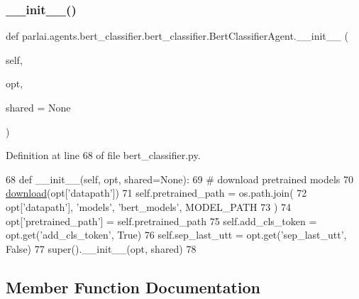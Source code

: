 \subsubsection{\texorpdfstring{\+\_\+\+\_\+init\+\_\+\+\_\+()}{\_\_init\_\_()}}
{\footnotesize\ttfamily def parlai.\+agents.\+bert\+\_\+classifier.\+bert\+\_\+classifier.\+Bert\+Classifier\+Agent.\+\_\+\+\_\+init\+\_\+\+\_\+ (\begin{DoxyParamCaption}\item[{}]{self,  }\item[{}]{opt,  }\item[{}]{shared = {\ttfamily None} }\end{DoxyParamCaption})}



Definition at line 68 of file bert\+\_\+classifier.\+py.


\begin{DoxyCode}
68     \textcolor{keyword}{def }\_\_init\_\_(self, opt, shared=None):
69         \textcolor{comment}{# download pretrained models}
70         \hyperlink{namespaceparlai_1_1core_1_1build__data_ab74f0e428f05e5d91fa93c8afb367622}{download}(opt[\textcolor{stringliteral}{'datapath'}])
71         self.pretrained\_path = os.path.join(
72             opt[\textcolor{stringliteral}{'datapath'}], \textcolor{stringliteral}{'models'}, \textcolor{stringliteral}{'bert\_models'}, MODEL\_PATH
73         )
74         opt[\textcolor{stringliteral}{'pretrained\_path'}] = self.pretrained\_path
75         self.add\_cls\_token = opt.get(\textcolor{stringliteral}{'add\_cls\_token'}, \textcolor{keyword}{True})
76         self.sep\_last\_utt = opt.get(\textcolor{stringliteral}{'sep\_last\_utt'}, \textcolor{keyword}{False})
77         super().\_\_init\_\_(opt, shared)
78 
\end{DoxyCode}


\subsection{Member Function Documentation}
\mbox{\label{classparlai_1_1agents_1_1bert__classifier_1_1bert__classifier_1_1BertClassifierAgent_a461c2531f3428f00804184df95dd6070}} 
